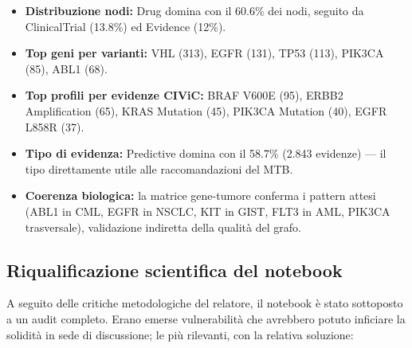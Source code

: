 \documentclass[11pt,a4paper]{article}
\begin{document}
\begin{itemize}
\item \textbf{Distribuzione nodi:} Drug domina con il 60.6\% dei nodi, seguito da ClinicalTrial (13.8\%) ed Evidence (12\%).
\item \textbf{Top geni per varianti:} VHL (313), EGFR (131), TP53 (113), PIK3CA (85), ABL1 (68).
\item \textbf{Top profili per evidenze CIViC:} BRAF V600E (95), ERBB2 Amplification (65), KRAS Mutation (45), PIK3CA Mutation (40), EGFR L858R (37).
\item \textbf{Tipo di evidenza:} Predictive domina con il 58.7\% (2.843 evidenze) --- il tipo direttamente utile alle raccomandazioni del MTB.
\item \textbf{Coerenza biologica:} la matrice gene-tumore conferma i pattern attesi (ABL1 in CML, EGFR in NSCLC, KIT in GIST, FLT3 in AML, PIK3CA trasversale), validazione indiretta della qualit\`a del grafo.
\end{itemize}

\subsection{Riqualificazione scientifica del notebook}
A seguito delle critiche metodologiche del relatore, il notebook \`e stato sottoposto a un audit completo. Erano emerse vulnerabilit\`a che avrebbero potuto inficiare la solidit\`a in sede di discussione; le pi\`u rilevanti, con la relativa soluzione:
\end{document}
